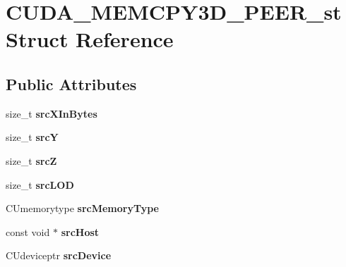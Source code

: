 \hypertarget{structCUDA__MEMCPY3D__PEER__st}{}\section{C\+U\+D\+A\+\_\+\+M\+E\+M\+C\+P\+Y3\+D\+\_\+\+P\+E\+E\+R\+\_\+st Struct Reference}
\label{structCUDA__MEMCPY3D__PEER__st}
\subsection*{Public Attributes}
\begin{DoxyCompactItemize}
\item 
size\+\_\+t {\bfseries src\+X\+In\+Bytes}\hypertarget{structCUDA__MEMCPY3D__PEER__st_a8c05d566c4869f460fc6fd2accffc183}{}\label{structCUDA__MEMCPY3D__PEER__st_a8c05d566c4869f460fc6fd2accffc183}

\item 
size\+\_\+t {\bfseries srcY}\hypertarget{structCUDA__MEMCPY3D__PEER__st_a87ec5178a42531194b7a3f735df56aa0}{}\label{structCUDA__MEMCPY3D__PEER__st_a87ec5178a42531194b7a3f735df56aa0}

\item 
size\+\_\+t {\bfseries srcZ}\hypertarget{structCUDA__MEMCPY3D__PEER__st_a8553e77448e08c089450936b31765a38}{}\label{structCUDA__MEMCPY3D__PEER__st_a8553e77448e08c089450936b31765a38}

\item 
size\+\_\+t {\bfseries src\+L\+OD}\hypertarget{structCUDA__MEMCPY3D__PEER__st_aee857d1da7137ac17cef1029164d4dca}{}\label{structCUDA__MEMCPY3D__PEER__st_aee857d1da7137ac17cef1029164d4dca}

\item 
C\+Umemorytype {\bfseries src\+Memory\+Type}\hypertarget{structCUDA__MEMCPY3D__PEER__st_ae265e947a32713dc884e450787da7cac}{}\label{structCUDA__MEMCPY3D__PEER__st_ae265e947a32713dc884e450787da7cac}

\item 
const void $\ast$ {\bfseries src\+Host}\hypertarget{structCUDA__MEMCPY3D__PEER__st_adfb924d9760ef6504e5d01e2ad4e7e30}{}\label{structCUDA__MEMCPY3D__PEER__st_adfb924d9760ef6504e5d01e2ad4e7e30}

\item 
C\+Udeviceptr {\bfseries src\+Device}\hypertarget{structCUDA__MEMCPY3D__PEER__st_a8958dfd13b53b55736c099e4197ca3ef}{}\label{structCUDA__MEMCPY3D__PEER__st_a8958dfd13b53b55736c099e4197ca3ef}


\end{DoxyCompactItemize}
